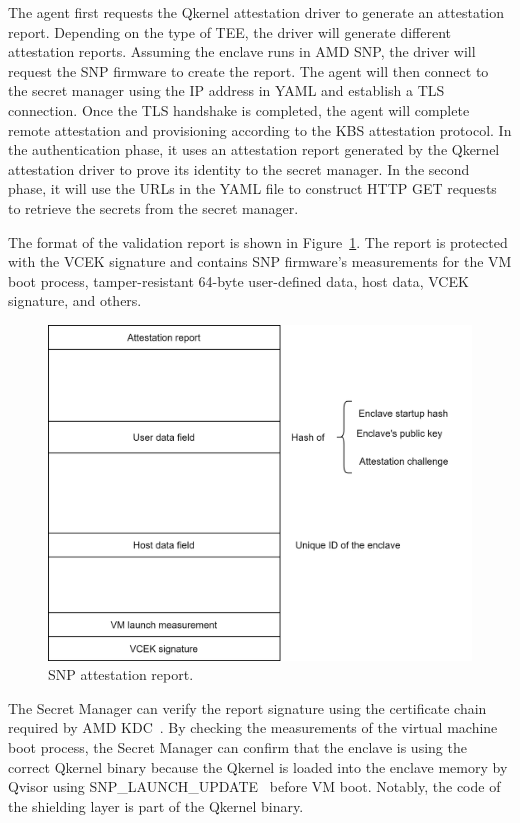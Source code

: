 The agent first requests the Qkernel attestation driver to generate an attestation report. Depending on the type of TEE, the driver will generate different attestation reports. Assuming the enclave runs in AMD SNP, the driver will request the SNP firmware to create the report. The agent will then connect to the secret manager using the IP address in YAML and 
establish a TLS connection. Once the TLS handshake is completed, the agent will complete remote attestation and provisioning according to the KBS attestation protocol. In the authentication phase, it uses an attestation report generated by the Qkernel attestation driver to prove its identity to the secret manager. In the second phase, it will use the URLs in 
the YAML file to construct HTTP GET requests to retrieve the secrets from the secret manager.

The format of the validation report is shown in Figure~\ref*{fig:attestation_report_format}. The report is protected with the VCEK signature and contains SNP firmware's measurements for the VM boot process, tamper-resistant 64-byte user-defined data, host data, VCEK signature, and others.
\begin{figure}[!htb]
    \centering
    \includegraphics[height=0.3\textheight]{images/attestation_report_format.png}
    \caption[SNP attestation report]{SNP attestation report.}
    \label{fig:attestation_report_format}
\end{figure}
The Secret Manager can verify the report signature using the certificate chain required by AMD KDC~\cite*{snp_kdc}. By checking the measurements of the virtual machine boot process, the Secret Manager can confirm that the enclave is using the correct Qkernel binary because the Qkernel is loaded into the enclave memory by Qvisor using 
SNP\_LAUNCH\_UPDATE~\cite*{snp_firmware}
before VM boot. Notably, the code of the shielding layer is part of the Qkernel binary.


